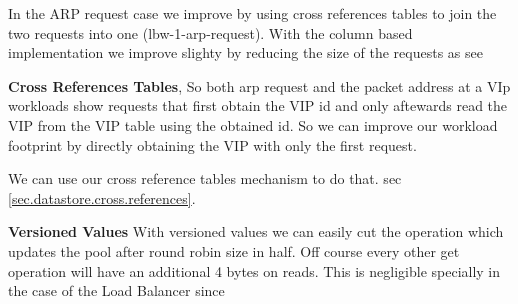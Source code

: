 \documentclass[12pt,openright,twoside]{report}
\begin{document}
\begin{figure}[ht]


\begin{floatrow}


\end{floatrow}
\end{figure}



In the ARP request case  we improve by using cross references tables
to join the two requests into one (lbw-1-arp-request). With the column
based implementation we improve slighty by reducing the size of the
requests as see 

\textbf{Cross References Tables}, So both arp request and the packet address at a VIp workloads show
requests that first obtain the VIP id and only aftewards read the VIP
from the VIP table using the obtained id. So we can improve our
workload footprint by directly obtaining the VIP with only the first
request. 

We can use our cross reference tables mechanism to do that. sec
\ref{sec.datastore.cross.references}. 

\textbf{Versioned Values} With versioned values we can easily  cut the operation which updates
the pool after round robin size in half.  Off course every other get
operation will have an additional 4 bytes on reads. This is negligible  specially in the case of the Load Balancer
since 
\end{document}
